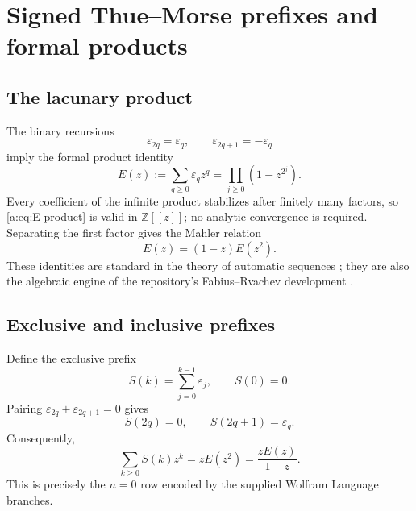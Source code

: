 \documentclass[11pt,a4paper,oneside,openany]{book}
\numberwithin{equation}{chapter}
\theoremstyle{definition}
\theoremstyle{remark}
\newcommand{\Z}{\mathbb Z}
\newcommand{\eps}{\varepsilon}
\begin{document}
\chapter{Signed Thue--Morse prefixes and formal products}\label{ch:prefixes}

\section{The lacunary product}

The binary recursions
\begin{equation}
  \eps_{2q}=\eps_q,
  \qquad
  \eps_{2q+1}=-\eps_q
  \label{a:eq:tm-recursion}
\end{equation}
imply the formal product identity
\begin{equation}
 E(z):=\sum_{q\ge0}\eps_qz^q
 =\prod_{j\ge0}(1-z^{2^j}).
 \label{a:eq:E-product}
\end{equation}
Every coefficient of the infinite product stabilizes after finitely many
factors, so \eqref{a:eq:E-product} is valid in \(\Z[[z]]\); no analytic
convergence is required.  Separating the first factor gives the Mahler
relation
\begin{equation}
 E(z)=(1-z)E(z^2).
 \label{a:eq:Mahler}
\end{equation}
These identities are standard in the theory of automatic sequences
\cite{allouche-shallit-book}; they are also the algebraic engine of the repository's
Fabius--Rvachev development \cite{atlas}.

\section{Exclusive and inclusive prefixes}

Define the exclusive prefix
\begin{equation}
 S(k)=\sum_{j=0}^{k-1}\eps_j,
 \qquad S(0)=0.
 \label{a:eq:exclusive-prefix}
\end{equation}
Pairing \(\eps_{2q}+\eps_{2q+1}=0\) gives
\begin{equation}
 S(2q)=0,
 \qquad
 S(2q+1)=\eps_q.
 \label{a:eq:prefix-collapse}
\end{equation}
Consequently,
\begin{equation}
 \sum_{k\ge0}S(k)z^k
 =zE(z^2)
 =\frac{zE(z)}{1-z}.
 \label{a:eq:prefix-gf}
\end{equation}
This is precisely the \(n=0\) row encoded by the supplied Wolfram Language
branches.
\end{document}

